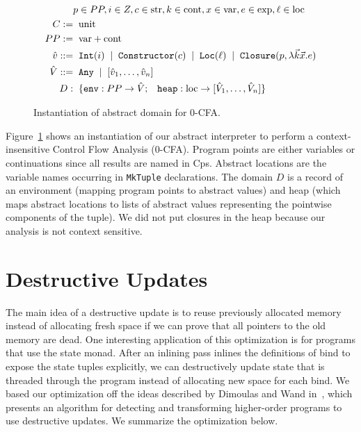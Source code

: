\documentclass{article}
\begin{document}
\begin{figure}
\begin{align*}
& p \in PP, i \in Z, c \in \text{str}, k \in \text{cont}, x \in \text{var}, e \in \text{exp}, \ell \in \text{loc} \\
C := & \;\; \text{unit} \\
PP := & \;\; \text{var} + \text{cont} \\
\hat{v} ::= & \;\; \texttt{Int}(i) \;\; | \;\; \texttt{Constructor}(c) \;\; | \;\; \texttt{Loc}(\ell) \;\; | \;\; \texttt{Closure}(p, \lambda \vec{k} \vec{x}. e) \\
\hat{V}::= & \;\; \texttt{Any} \;\; | \;\; [\hat{v}_1, \hdots, \hat{v}_n] \\
D: & \;\; \{{\tt env}: PP \rightarrow \hat{V} ; \;\;\; {\tt heap}: \text{loc} \rightarrow [\hat{V}_1, \hdots, \hat{V}_n] \}
\end{align*}
\caption{Instantiation of abstract domain for 0-CFA.}
\label{fig:cfa0}
\end{figure}
Figure~\ref{fig:cfa0} shows an instantiation of our abstract interpreter to perform a context-insensitive Control Flow Analysis (0-CFA). Program points are either variables or continuations since all results are named in Cps. Abstract locations are the variable names occurring in {\tt MkTuple} declarations. The domain $D$ is a record of an environment (mapping program points to abstract values) and heap (which maps abstract locations to lists of abstract values representing the pointwise components of the tuple). We did not put closures in the heap because our analysis is not context sensitive.

\section{Destructive Updates}
\label{sec:destructive-updates}

The main idea of a destructive update is to reuse previously allocated memory instead of allocating fresh space if we can prove that all pointers to the old memory are dead. One interesting application of this optimization is for programs that use the state monad. After an inlining pass inlines the definitions of bind to expose the state tuples explicitly, we can destructively update state that is threaded through the program instead of allocating new space for each bind. We based our optimization off the ideas described by Dimoulas and Wand in~\cite{dimoulas2009higher}, which presents an algorithm for detecting and transforming higher-order programs to use destructive updates. We summarize the optimization below. 
\end{document}
